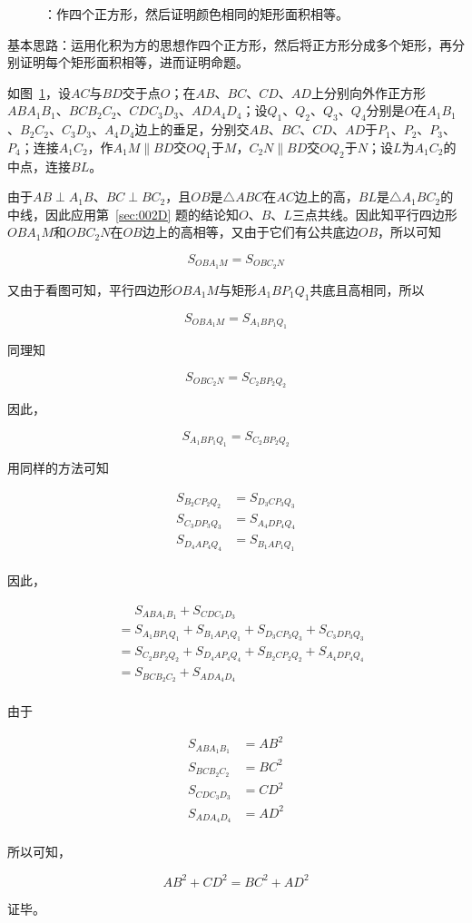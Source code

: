 \begin{figure}[htbp]
  \centering
  \caption{：作四个正方形，然后证明颜色相同的矩形面积相等。}
  \label{fig:002E-squ}
\end{figure}

基本思路：运用化积为方的思想作四个正方形，然后将正方形分成多个矩形，再分别证明每个矩形面积相等，进而证明命题。

如图~\ref{fig:002E-squ}，设$AC$与$BD$交于点$O$；在$AB$、$BC$、$CD$、$AD$上分别向外作正方形$ABA_1B_1$、$BCB_2C_2$、$CDC_3D_3$、$ADA_4D_4$；设$Q_1$、$Q_2$、$Q_3$、$Q_4$分别是$O$在$A_1B_1$、$B_2C_2$、$C_3D_3$、$A_4D_4$边上的垂足，分别交$AB$、$BC$、$CD$、$AD$于$P_1$、$P_2$、$P_3$、$P_4$；连接$A_1C_2$，作$A_1M \parallel BD$交$OQ_1$于$M$，$C_2N \parallel BD$交$OQ_2$于$N$；设$L$为$A_1C_2$的中点，连接$BL$。

由于$AB \perp A_1B$、$BC \perp BC_2$，且$OB$是$\triangle ABC$在$AC$边上的高，$BL$是$\triangle A_1BC_2$的中线，因此应用第~\ref{sec:002D} 题的结论知$O$、$B$、$L$三点共线。因此知平行四边形$OBA_1M$和$OBC_2N$在$OB$边上的高相等，又由于它们有公共底边$OB$，所以可知

\[ S_{OBA_1M} = S_{OBC_2N} \]

又由于看图可知，平行四边形$OBA_1M$与矩形$A_1BP_1Q_1$共底且高相同，所以

\[ S_{OBA_1M} = S_{A_1BP_1Q_1} \]

同理知

\[ S_{OBC_2N} = S_{C_2BP_2Q_2} \]

因此，

\[ S_{A_1BP_1Q_1} = S_{C_2BP_2Q_2} \]

用同样的方法可知

\begin{align*}
  S_{B_2CP_2Q_2} &= S_{D_3CP_3Q_3} \\
  S_{C_3DP_3Q_3} &= S_{A_4DP_4Q_4} \\
  S_{D_4AP_4Q_4} &= S_{B_1AP_1Q_1} \\
\end{align*}

因此，

\begin{align*}
  &\phantom{=} S_{ABA_1B_1} + S_{CDC_3D_3} \\
  &= S_{A_1BP_1Q_1} + S_{B_1AP_1Q_1} + S_{D_3CP_3Q_3} + S_{C_3DP_3Q_3} \\
  &= S_{C_2BP_2Q_2} + S_{D_4AP_4Q_4} + S_{B_2CP_2Q_2} + S_{A_4DP_4Q_4} \\
  &= S_{BCB_2C_2} + S_{ADA_4D_4} \\
\end{align*}

由于

\begin{align*}
  S_{ABA_1B_1} &= AB^2 \\
  S_{BCB_2C_2} &= BC^2 \\
  S_{CDC_3D_3} &= CD^2 \\
  S_{ADA_4D_4} &= AD^2 \\
\end{align*}

所以可知，

\[ AB^2 + CD^2 = BC^2 + AD^2 \]

证毕。
